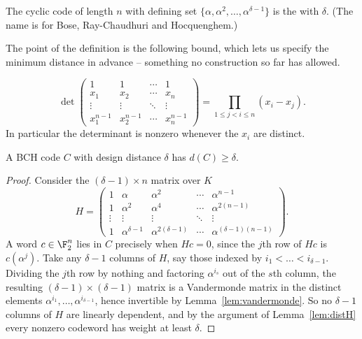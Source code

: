 \begin{definition}
	The cyclic code of length $n$ with defining set $\{\alpha,\alpha^2,\dots,\alpha^{\delta-1}\}$ is the  with  $\delta$. (The name is for Bose, Ray-Chaudhuri and Hocquenghem.)
\end{definition}

The point of the definition is the following bound, which lets us specify the minimum distance in advance -- something no construction so far has allowed.

\begin{lemma}[Vandermonde]\label{lem:vandermonde}
	$$\det\begin{pmatrix}
		1 & 1 & \cdots & 1\\
		x_1 & x_2 & \cdots & x_n\\
		\vdots & \vdots & \ddots & \vdots\\
		x_1^{n-1} & x_2^{n-1} & \cdots & x_n^{n-1}
	\end{pmatrix} = \prod_{1\le j<i\le n}(x_i-x_j).$$
	In particular the determinant is nonzero whenever the $x_i$ are distinct.
\end{lemma}

\begin{theorem}
	A BCH code $C$ with design distance $\delta$ has $d(C)\ge\delta$.
\end{theorem}

\begin{proof}
	Consider the $(\delta-1)\times n$ matrix over $K$
	$$H = \begin{pmatrix}
		1 & \alpha & \alpha^2 & \cdots & \alpha^{n-1}\\
		1 & \alpha^2 & \alpha^4 & \cdots & \alpha^{2(n-1)}\\
		\vdots & \vdots & \vdots & \ddots & \vdots\\
		1 & \alpha^{\delta-1} & \alpha^{2(\delta-1)} & \cdots & \alpha^{(\delta-1)(n-1)}
	\end{pmatrix}.$$
	A word $c \in \F_2^n$ lies in $C$ precisely when $Hc = 0$, since the $j$th row of $Hc$ is $c(\alpha^j)$. Take any $\delta-1$ columns of $H$, say those indexed by $i_1<\dots<i_{\delta-1}$. Dividing the $j$th row by nothing and factoring $\alpha^{i_s}$ out of the $s$th column, the resulting $(\delta-1)\times(\delta-1)$ matrix is a Vandermonde matrix in the distinct elements $\alpha^{i_1},\dots,\alpha^{i_{\delta-1}}$, hence invertible by Lemma~\ref{lem:vandermonde}. So no $\delta-1$ columns of $H$ are linearly dependent, and by the argument of Lemma~\ref{lem:distH} every nonzero codeword has weight at least $\delta$.
\end{proof}

